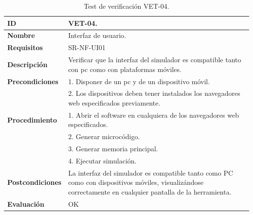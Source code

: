 \begin{center}
\begin{table}[htb]
\centering
\caption{Test de verificación VET-04.}
\begin{tabular}{@{}p{2.5cm} p{13cm}@{}} 
\toprule
\textbf{ID} 					& VET-04. \\
\midrule
\textbf{Nombre} 				& Interfaz de usuario. \\
\midrule
\textbf{Requisitos} 		& SR-NF-UI01\\
\midrule
\textbf{Descripción} 		& Verificar que la interfaz del simulador es compatible tanto con pc como con plataformas móviles. \\
\midrule
\textbf{Precondiciones}		& 1. Disponer de un pc y de un dispositivo móvil. \\
											& 2. Los dispositivos deben tener instalados los navegadores web especificados previamente. \\
\midrule
\textbf{Procedimiento}			& 1. Abrir el software en cualquiera de los navegadores web especificados. \\
							& 2. Generar microcódigo.\\
							& 3. Generar memoria principal.\\
							& 4. Ejecutar simulación.\\
\midrule
\textbf{Postcondiciones} 		&  La interfaz del simulador es compatible tanto como PC como con dispositivos móviles, visualizándose correctamente en cualquier pantalla de la herramienta.\\
\midrule
\textbf{Evaluación} 			& OK \\
\bottomrule
\end{tabular}
\label{tab:vet04}
\end{table}
\end{center}

